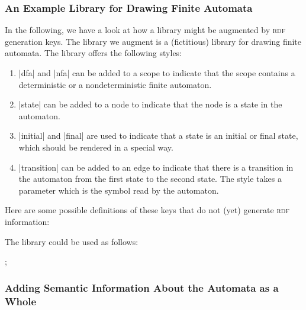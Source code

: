 \subsubsection{An Example Library for Drawing Finite Automata}

In the following, we have a look at how a library might be augmented by
\textsc{rdf} generation keys. The library we augment is a (fictitious) library
for drawing finite automata. The library offers the following styles:
%
\begin{enumerate}
    \item |dfa| and |nfa| can be added to a scope to indicate that the scope
        contains a deterministic or a nondeterministic finite automaton.
    \item |state| can be added to a node to indicate that the node is a state
        in the automaton.
    \item |initial| and |final| are used to indicate that a state is an initial
        or final state, which should be rendered in a special way.
    \item |transition| can be added to an edge to indicate that there is a
        transition in the automaton from the first state to the second state.
        The style takes a parameter which is the symbol read by the automaton.
\end{enumerate}

Here are some possible definitions of these keys that do not (yet) generate
\textsc{rdf} information:
%
\begin{codeexample}
\end{codeexample}

The library could be used as follows:
%
\begin{codeexample}[width=5cm]
\tikz [dfa]
  ;
\end{codeexample}


\subsubsection{Adding Semantic Information About the Automata as a Whole}

